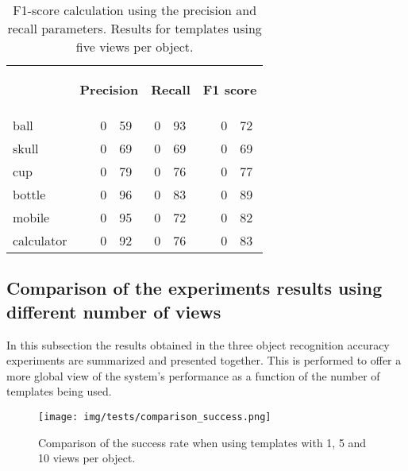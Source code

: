 \begin{table}[H]
\centering
\begin{tabular} {l l r@{.}l r@{.}l l r@{.}l }
\toprule
\addlinespace[3mm]
   \multicolumn{1}{c}{\begin{center}\textbf{Object}\end{center}} &
   \multicolumn{3}{c}{\begin{flushright}\textbf{Precision}\end{flushright}} &
   \multicolumn{2}{c}{\begin{flushright}\textbf{Recall}\end{flushright}} &
   \multicolumn{3}{c}{\begin{flushright}\hspace*{0.2cm}\textbf{F1 score}\end{flushright}} &\\
\addlinespace[-3mm]

\midrule
ball		&&	0&59 	&	0&93	&&	0&72	\\
skull		&&	0&69	&	0&69	&&	0&69	\\
cup			&&	0&79	&	0&76	&&	0&77	\\
bottle		&&	0&96	&	0&83	&&	0&89	\\
mobile		&&	0&95	&	0&72	&&	0&82	\\
calculator	&&	0&92	&	0&76	&&	0&83	\\

\bottomrule
\end{tabular}
\caption[F1-score - templates using 5 views]{F1-score calculation using the precision and recall parameters. Results for templates using five views per object. }
\label{10views_fscore}
\end{table}








	\subsection{Comparison of the experiments results using different number of views}
	In this subsection the results obtained in the three object recognition accuracy experiments are summarized and presented together. 
	This is performed to offer a more global view of the system's performance as a function of the number of templates being used. 

	\begin{figure}[H]
		\begin{center}
	    \texttt{[image: img/tests/comparison\_success.png]}
		\caption[Comparison of the success rate]{Comparison of the success rate when using templates with 1, 5 and 10 views per object.}
		\label{comparison_success}
		\end{center}
	\end{figure}

